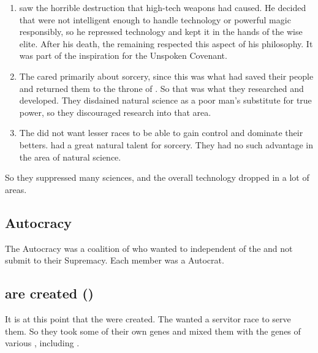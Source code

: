 \begin{enumerate}
  \item 
    \Nexagglachel saw the horrible destruction that high-tech weapons had caused.
    He decided that \humanoids were not intelligent enough to handle technology or powerful magic responsibly, so he repressed technology and kept it in the hands of the wise elite. 
    After his death, the remaining \dragons respected this aspect of his philosophy.
    It was part of the inspiration for the Unspoken Covenant. 

  \item 
    The \dragons cared primarily about sorcery, since this was what had saved their people and returned them to the throne of \Miith. 
    So that was what they researched and developed. 
    They disdained natural science as a poor man's substitute for true power, so they discouraged research into that area. 

  \item 
    The \dragons did not want lesser races to be able to gain control and dominate their betters. 
    \Dragons had a great natural talent for sorcery. 
    They had no such advantage in the area of natural science. 
\end{enumerate}

So they suppressed many sciences, and the overall technology dropped in a lot of areas. 





\subsection{\Caisith Autocracy}
The \Caisith Autocracy was a coalition of \ophidians who wanted to independent of the \dragons and not submit to their Supremacy. 
Each member was a \Caisith Autocrat.









\subsection[Scathae are created (\yds{Scathae created})]{\Scathae are created ()}
It is at this point that the \scathae were created. 
The \dragons{} wanted a servitor race to serve them. 
So they took some of their own \ophidian genes and mixed them with the genes of various \saurians, including . 

